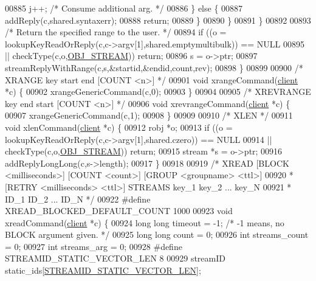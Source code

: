 \begin{DoxyCode}
{{{{00885                 j++; \textcolor{comment}{/* Consume additional arg. */}
00886             \} \textcolor{keywordflow}{else} \{
00887                 addReply(c,shared.syntaxerr);
00888                 \textcolor{keywordflow}{return};
00889             \}
00890         \}
00891     \}
00892 
00893     \textcolor{comment}{/* Return the specified range to the user. */}
00894     \textcolor{keywordflow}{if} ((o = lookupKeyReadOrReply(c,c->argv[1],shared.emptymultibulk)) == NULL
00895         || checkType(c,o,\hyperlink{server_8h_a2c2cc41300ca6b9daca7ea8a6d66edc6}{OBJ\_STREAM})) \textcolor{keywordflow}{return};
00896     s = o->ptr;
00897     streamReplyWithRange(c,s,&startid,&endid,count,rev);
00898 \}
00899 
00900 \textcolor{comment}{/* XRANGE key start end [COUNT <n>] */}
00901 \textcolor{keywordtype}{void} xrangeCommand(\hyperlink{structclient}{client} *c) \{
00902     xrangeGenericCommand(c,0);
00903 \}
00904 
00905 \textcolor{comment}{/* XREVRANGE key end start [COUNT <n>] */}
00906 \textcolor{keywordtype}{void} xrevrangeCommand(\hyperlink{structclient}{client} *c) \{
00907     xrangeGenericCommand(c,1);
00908 \}
00909 
00910 \textcolor{comment}{/* XLEN */}
00911 \textcolor{keywordtype}{void} xlenCommand(\hyperlink{structclient}{client} *c) \{
00912     robj *o;
00913     \textcolor{keywordflow}{if} ((o = lookupKeyReadOrReply(c,c->argv[1],shared.czero)) == NULL
00914         || checkType(c,o,\hyperlink{server_8h_a2c2cc41300ca6b9daca7ea8a6d66edc6}{OBJ\_STREAM})) \textcolor{keywordflow}{return};
00915     stream *s = o->ptr;
00916     addReplyLongLong(c,s->length);
00917 \}
00918 
00919 \textcolor{comment}{/* XREAD [BLOCK <milliseconds>] [COUNT <count>] [GROUP <groupname> <ttl>]}
00920 \textcolor{comment}{ *       [RETRY <milliseconds> <ttl>] STREAMS key\_1 key\_2 ... key\_N}
00921 \textcolor{comment}{ *       ID\_1 ID\_2 ... ID\_N */}
00922 \textcolor{preprocessor}{#}\textcolor{preprocessor}{define} \textcolor{preprocessor}{XREAD\_BLOCKED\_DEFAULT\_COUNT} 1000
00923 \textcolor{keywordtype}{void} xreadCommand(\hyperlink{structclient}{client} *c) \{
00924     \textcolor{keywordtype}{long} \textcolor{keywordtype}{long} timeout = -1; \textcolor{comment}{/* -1 means, no BLOCK argument given. */}
00925     \textcolor{keywordtype}{long} \textcolor{keywordtype}{long} count = 0;
00926     \textcolor{keywordtype}{int} streams\_count = 0;
00927     \textcolor{keywordtype}{int} streams\_arg = 0;
00928     \textcolor{preprocessor}{#}\textcolor{preprocessor}{define} \textcolor{preprocessor}{STREAMID\_STATIC\_VECTOR\_LEN} 8
00929     streamID static\_ids[\hyperlink{t__stream_8c_a3198b5313f2414b2a54b05140a44a437}{STREAMID\_STATIC\_VECTOR\_LEN}];
}}}}
\end{DoxyCode}
